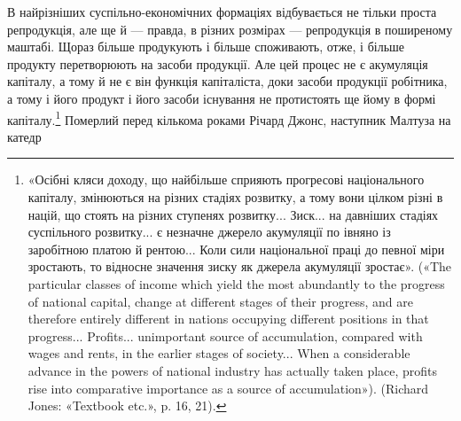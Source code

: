 В найрізніших суспільно-економічних формаціях відбувається
не тільки проста репродукція, але ще й — правда, в різних
розмірах — репродукція в поширеному маштабі. Щораз більше
продукують і більше споживають, отже, і більше продукту перетворюють
на засоби продукції. Але цей процес не є акумуляція
капіталу, а тому й не є він функція капіталіста, доки засоби продукції
робітника, а тому і його продукт і його засоби існування
не протистоять ще йому в формі капіталу.\footnote{
«Осібні кляси доходу, що найбільше сприяють прогресові національного
капіталу, змінюються на різних стадіях розвитку, а тому вони
цілком різні в націй, що стоять на різних ступенях розвитку... Зиск...
на давніших стадіях суспільного розвитку... є незначне джерело акумуляції
по івняно із заробітною платою й рентою... Коли сили національної
праці до певної міри зростають, то відносне значення зиску як
джерела акумуляції зростає». («The particular classes of income which
yield the most abundantly to the progress of national capital, change at
different stages of their progress, and are therefore entirely different in
nations occupying different positions in that progress... Profits... unimportant
source of accumulation, compared with wages and rents, in the
earlier stages of society... When a considerable advance in the powers of
national industry has actually taken place, profits rise into comparative
importance as a source of accumulation»). (Richard Jones: «Textbook
etc.», p. 16, 21).
} Померлий перед
кількома роками Річард Джонс, наступник Малтуза на катедр